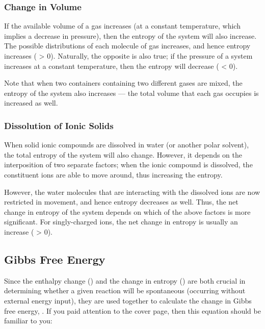 
		\subsubsection{Change in Volume}

			If the available volume of a gas increases (at a constant temperature, which implies a decrease in pressure), then the entropy
			of the system will also increase. The possible distributions of each molecule of gas increases, and hence entropy increases
			(\entr{} > 0). Naturally, the opposite is also true; if the pressure of a system increases at a constant temperature, then the entropy
			will decrease (\entr{} < 0).

			Note that when two containers containing two different gases are mixed, the entropy of the system also increases –– the total
			volume that each gas occupies is increased as well.



		\pagebreak
		\subsubsection{Dissolution of Ionic Solids}

			When solid ionic compounds are dissolved in water (or another polar solvent), the total entropy of the system will also change.
			However, it depends on the interposition of two separate factors; when the ionic compound is dissolved, the constituent ions are
			able to move around, thus increasing the entropy.

			However, the water molecules that are interacting with the dissolved ions are now restricted in movement, and hence entropy decreases
			as well. Thus, the net change in entropy of the system depends on which of the above factors is more significant. For singly-charged
			ions, the net change in entropy is usually an increase (\entr{} > 0).




	\subsection{Gibbs Free Energy}

		Since the enthalpy change (\enth{}) and the change in entropy (\entr{}) are both crucial in determining whether a given reaction will
		be spontaneous (occurring without external energy input), they are used together to calculate the change in Gibbs free energy, \gibb{}.
		If you paid attention to the cover page, then this equation should be familiar to you:


